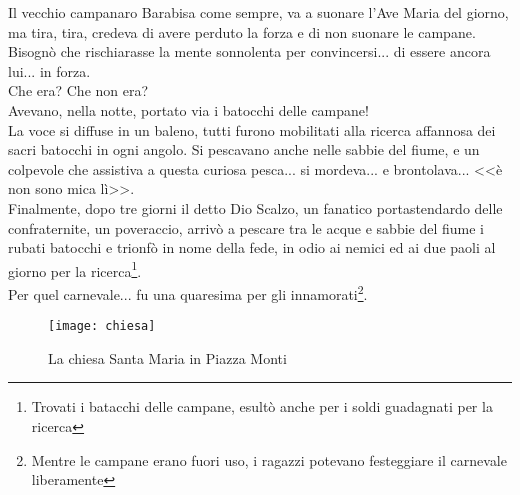 Il vecchio campanaro Barabisa come sempre, va a suonare l'Ave Maria del giorno, ma tira, tira, credeva di avere perduto la forza e di non suonare le campane. Bisognò che rischiarasse la mente sonnolenta per convincersi... di essere ancora lui... in forza.\\
\indent Che era? Che non era?\\
\indent Avevano, nella notte, portato via i batocchi delle campane!\\
\indent La voce si diffuse in un baleno, tutti furono mobilitati alla ricerca affannosa dei sacri batocchi in ogni angolo. Si pescavano anche nelle sabbie del fiume, e un colpevole che assistiva a questa curiosa pesca... si mordeva... e brontolava... <<è non sono mica lì>>.\\
\indent Finalmente, dopo tre giorni il detto Dio Scalzo, un fanatico portastendardo delle confraternite, un poveraccio, arrivò a pescare tra le acque e sabbie del fiume i rubati batocchi e trionfò in nome della fede, in odio ai nemici ed ai due paoli al giorno per la ricerca\footnote{Trovati i batacchi delle campane, esultò anche per i soldi guadagnati per la ricerca}.\\
\indent Per quel carnevale... fu una quaresima per gli innamorati\footnote{Mentre le campane erano fuori uso, i ragazzi potevano festeggiare il carnevale liberamente}.
 \begin{figure}[htb]
    \centering
    \vspace{-0.2cm}
    \texttt{[image: chiesa]}
    \caption*{La chiesa Santa Maria in Piazza Monti\label{fig:chiesa}}
    \vspace{-0.2cm}
\end{figure}






















%